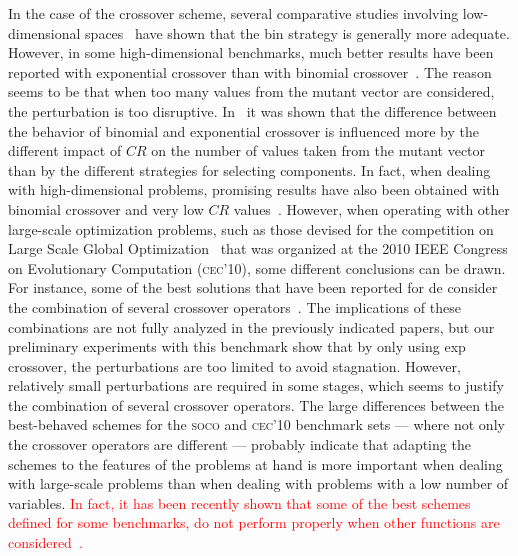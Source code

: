 \documentclass[review,3p]{elsarticle}
\newcommand{\DE}{{\sc de}}
\begin{document}
In the case of the crossover scheme, several comparative
studies involving low-dimensional spaces~\cite{Mezura-Montes:06} have shown
that the bin strategy is generally more adequate.
%
%
%
However, in some high-dimensional benchmarks, much better results have been reported
with exponential crossover than with binomial crossover~\cite{LaTorre:11}.
%
The reason seems to be that when too many values from the mutant vector are considered, the perturbation is too disruptive.
%
In~\cite{Zaharie:09} it was shown that the difference between the behavior of binomial
and exponential crossover is influenced more by the different impact of $CR$
on the number of values taken from the mutant vector than by the different strategies for selecting components.
%
In fact, when dealing with high-dimensional problems, promising results have also been obtained with binomial crossover and very low $CR$ values~\cite{Olguin:13}.
%
However, when operating with other large-scale optimization problems, such as those devised for the
competition on Large Scale Global Optimization~\cite{Tang:10} that was organized at the 2010 IEEE Congress on Evolutionary Computation (\textsc{cec'10}),
some different conclusions can be drawn.
%
For instance, some of the best solutions that have been reported for \DE{} consider the combination of several crossover operators~\cite{Wang:10,Brest:12}.
%
The implications of these combinations are not fully analyzed in the previously indicated papers, but our preliminary experiments with this benchmark show that
by only using exp crossover, the perturbations are too limited to avoid stagnation.
%
However, relatively small perturbations are required in some stages, which seems to justify the combination of several crossover operators.
%
The large differences between the best-behaved schemes for the \textsc{soco} and \textsc{cec'10} benchmark sets --- where not only the 
crossover operators are different ---
%
probably indicate that adapting the schemes to the features of
the problems at hand is more important when dealing with large-scale problems than when dealing with problems with a low number of
variables.
%
\textcolor{red}{
In fact, it has been recently shown that some of the best schemes defined for some benchmarks, do not perform properly when other functions
are considered~\cite{LaTorre:14}.
}
\end{document}
